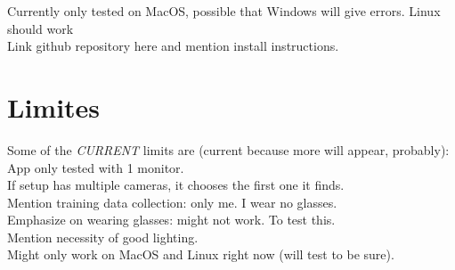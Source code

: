 Currently only tested on MacOS, possible that Windows will give errors. Linux should work\\

Link github repository here and mention install instructions.\\

\section{Limites}
Some of the \emph{CURRENT} limits are (current because more will appear, probably):
App only tested with 1 monitor.\\
If setup has multiple cameras, it chooses the first one it finds.\\
Mention training data collection: only me. I wear no glasses.\\
Emphasize on wearing glasses: might not work. To test this.\\

Mention necessity of good lighting.\\

Might only work on MacOS and Linux right now (will test to be sure).
